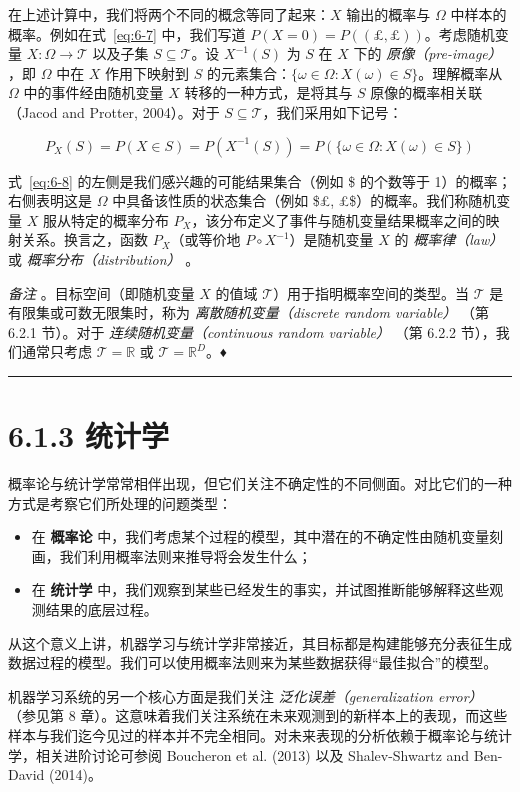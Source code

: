 在上述计算中，我们将两个不同的概念等同了起来：$ X $ 输出的概率与 $ \Omega $ 中样本的概率。例如在式~\eqref{eq:6-7} 中，我们写道 $ P(X = 0) = P((£, £)) $。考虑随机变量 $ X : \Omega \to \mathcal{T} $ 以及子集 $ S \subseteq \mathcal{T} $。设 $ X^{-1}(S) $ 为 $ S $ 在 $ X $ 下的 \emph{原像（pre-image）} ，即 $ \Omega $ 中在 $ X $ 作用下映射到 $ S $ 的元素集合：$ \{\omega \in \Omega : X(\omega) \in S\} $。理解概率从 $ \Omega $ 中的事件经由随机变量 $ X $ 转移的一种方式，是将其与 $ S $ 原像的概率相关联（Jacod and Protter, 2004）。对于 $ S \subseteq \mathcal{T} $，我们采用如下记号：

\begin{equation}
P_X(S) = P(X \in S) = P(X^{-1}(S)) = P(\{\omega \in \Omega : X(\omega) \in S\})
\tag{6.8}\label{eq:6-8}
\end{equation}

式~\eqref{eq:6-8} 的左侧是我们感兴趣的可能结果集合（例如 \$ 的个数等于 1）的概率；右侧表明这是 $ \Omega $ 中具备该性质的状态集合（例如 \$£, £\$）的概率。我们称随机变量 $ X $ 服从特定的概率分布 $ P_X $，该分布定义了事件与随机变量结果概率之间的映射关系。换言之，函数 $ P_X $（或等价地 $ P \circ X^{-1} $）是随机变量 $ X $ 的 \emph{概率律（law）} 或 \emph{概率分布（distribution）} 。

\emph{备注} 。目标空间（即随机变量 $ X $ 的值域 $ \mathcal{T} $）用于指明概率空间的类型。当 $ \mathcal{T} $ 是有限集或可数无限集时，称为 \emph{离散随机变量（discrete random variable）} （第 6.2.1 节）。对于 \emph{连续随机变量（continuous random variable）} （第 6.2.2 节），我们通常只考虑 $ \mathcal{T} = \mathbb{R} $ 或 $ \mathcal{T} = \mathbb{R}^D $。♦

\medskip\hrule\medskip

\section*{6.1.3 统计学}

概率论与统计学常常相伴出现，但它们关注不确定性的不同侧面。对比它们的一种方式是考察它们所处理的问题类型：

\begin{itemize}
\item 在 \textbf{概率论} 中，我们考虑某个过程的模型，其中潜在的不确定性由随机变量刻画，我们利用概率法则来推导将会发生什么；
\item 在 \textbf{统计学} 中，我们观察到某些已经发生的事实，并试图推断能够解释这些观测结果的底层过程。
\end{itemize}

从这个意义上讲，机器学习与统计学非常接近，其目标都是构建能够充分表征生成数据过程的模型。我们可以使用概率法则来为某些数据获得“最佳拟合”的模型。

机器学习系统的另一个核心方面是我们关注 \emph{泛化误差（generalization error）} （参见第 8 章）。这意味着我们关注系统在未来观测到的新样本上的表现，而这些样本与我们迄今见过的样本并不完全相同。对未来表现的分析依赖于概率论与统计学，相关进阶讨论可参阅 Boucheron et al. (2013) 以及 Shalev-Shwartz and Ben-David (2014)。
